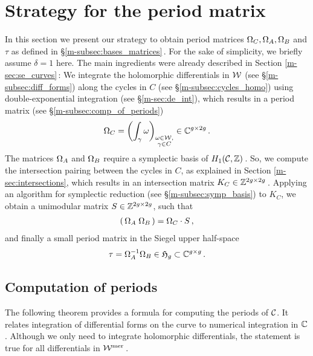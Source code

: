\documentclass[main.tex]{subfiles}
\begin{document}
  \section{Strategy for the period matrix}

  In this section we present our strategy to obtain period matrices $\Omega_C, \Omega_A, \Omega_B$ and $\tau$ as defined in \S \ref{m-subsec:bases_matrices}\,. For the sake
  of simplicity,  we briefly assume $\delta = 1$ here. The main ingredients were already described in
  Section \ref{m-sec:se_curves}\,: \abstand We integrate the holomorphic differentials in $\mathcal{W}$ (see \S \ref{m-subsec:diff_forms})
  along the cycles in $C$ (see  \S \ref{m-subsec:cycles_homo}) using double-exponential integration (see \S \ref{m-sec:de_int}), which results in a period matrix (see \S \ref{m-subsec:comp_of_periods})
  \begin{align}
    \Omega_C = \left( \int_{\gamma} \omega \right)_{\substack{\omega \in \mathcal{W}, \\ \gamma \in C}} \in \mathbb{C}^{g \times 2g}\,.
  \end{align}
  The matrices $\Omega_A$ and $\Omega_B$ require a symplectic basis of $H_1(\mathcal{C},\mathbb{Z})$\,.
  So, we compute the intersection pairing between the cycles in $C$, as explained in Section \ref{m-sec:intersections}, which results in an
  intersection matrix $K_C \in \mathbb{Z}^{2g \times 2g}$\,. \abstand
  Applying an algorithm for symplectic reduction (see \S \ref{m-subsec:symp_basis}) to $K_C$, we obtain a unimodular matrix $S \in \mathbb{Z}^{2g \times 2g}$, such that
  \begin{align}
   ( \, \Omega_A \; \Omega_B \, ) = \Omega_C \cdot S\,,
   \end{align}
   and finally a small period matrix in the Siegel upper half-space
   \begin{align}
   \tau = \Omega_A^{-1} \Omega_B \in \mathfrak{H}_g \subset \mathbb{C}^{g \times g}\,.
  \end{align}
  
  \bigskip
  
  \subsection{Computation of periods}\label{subsec:comp_of_periods}
  
  The following theorem provides a formula for computing the periods of $\mathcal{C}$. It relates integration of differential forms on the curve to numerical integration in $\mathbb{C}$.
  Although we only need to integrate holomorphic
  differentials, the statement is true for all differentials in $\mathcal{W}^{\text{mer}}$\,.
  
\end{document}
